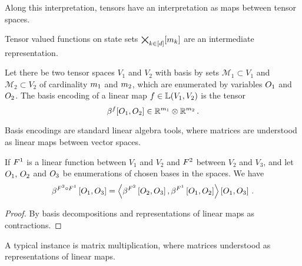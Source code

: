 Along this interpretation, tensors have an interpretation as maps between tensor spaces.


Tensor valued functions on state sets $\bigtimes_{k\in[d]}[m_{k}]$ are an intermediate representation.

\begin{definition}
    Let there be two tensor spaces $V_1$ and $V_2$ with basis by sets $\mathcal{M}_1\subset V_1$ and $\mathcal{M}_2\subset V_2$ of cardinality $m_{1}$ and $m_{2}$, which are enumerated by variables $O_{1}$ and $O_{2}$.
    The basis encoding of a linear map $f\in\mathbb{L}(V_1,V_2)$ is the tensor
    \[ \beta^{f}[O_{1},O_{2}] \in \mathbb{R}^{m_{1}} \otimes \mathbb{R}^{m_{2}} \, . \]
\end{definition}

Basis encodings are standard linear algebra tools, where matrices are understood as linear maps between vector spaces.

\begin{theorem}
    \label{the:linearCompositionBasisEncoding}
    If $F^{1}$ is a linear function between $V_1$ and $V_2$  and $F^{2}$ between $V_2$ and $V_3$, and let $O_{1},\,O_{2}$ and $O_{3}$ be enumerations of chosen bases in the spaces.
    We have
    \begin{align*}
        \beta^{F^{2}\circ F^{1}}\left[O_{1},O_{3}\right]
        = \left\langle 
            \beta^{F^{2}}\left[O_{2},O_{3}\right], \beta^{F^{1}}\left[O_{1},O_{2}\right]
        \right\rangle \left[ O_{1},O_{3} \right]  \, .
    \end{align*}
\end{theorem}
\begin{proof}
    By basis decompositions and representations of linear maps as contractions.
\end{proof}

A typical instance is matrix multiplication, where matrices understood as representations of linear maps.


